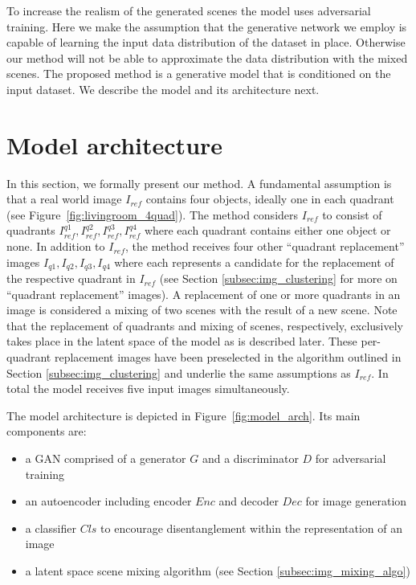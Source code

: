 \documentclass[a4paper,12pt]{report}
\begin{document}
To increase the realism of the generated scenes the model uses adversarial training. Here we make the assumption that the generative network we employ is capable of learning the input data distribution of the dataset in place. Otherwise our method will not be able to approximate the data distribution with the mixed scenes. The proposed method is a generative model that is conditioned on the input dataset. We describe the model and its architecture next.


\section{Model architecture}\label{subsec:model_arch}
In this section, we formally present our method. A fundamental assumption is that a real world image $I_{ref}$ contains four objects, ideally one in each quadrant (see Figure~\ref{fig:livingroom_4quad}). The method considers $I_{ref}$ to consist of quadrants $I^{q1}_{ref}, I^{q2}_{ref}, I^{q3}_{ref}, I^{q4}_{ref}$ where each quadrant contains either one object or none. In addition to $I_{ref}$, the method receives four other ``quadrant replacement'' images $I_{q1},I_{q2},I_{q3},I_{q4}$ where each represents a candidate for the replacement of the respective quadrant in $I_{ref}$ (see Section \ref{subsec:img_clustering} for more on ``quadrant replacement'' images). A replacement of one or more quadrants in an image is considered a mixing of two scenes with the result of a new scene. Note that the replacement of quadrants and mixing of scenes, respectively, exclusively takes place in the latent space of the model as is described later. These per-quadrant replacement images have been preselected in the algorithm outlined in Section \ref{subsec:img_clustering} and underlie the same assumptions as $I_{ref}$. In total the model receives five input images simultaneously.

The model architecture is depicted in Figure~\ref{fig:model_arch}. Its main components are:

\begin{itemize}
   \item a GAN comprised of a generator $G$ and a discriminator $D$ for adversarial training
   \item an autoencoder including encoder $Enc$ and decoder $Dec$ for image generation
   \item a classifier $Cls$ to encourage disentanglement within the representation of an image
   \item a latent space scene mixing algorithm (see Section \ref{subsec:img_mixing_algo})
\end{itemize}
 
\end{document}
